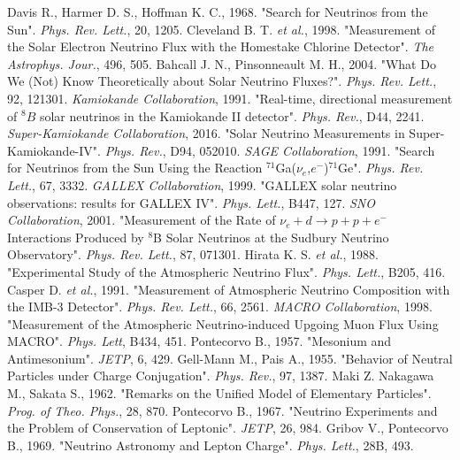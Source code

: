 \documentclass[english]{article}
\begin{document}
\begin{thebibliography}{99}
    Davis R., Harmer D. S., Hoffman K. C., 1968. "Search for Neutrinos from the Sun". \textit{Phys. Rev. Lett.}, 20, 1205.
    Cleveland B. T. \textit{et al.}, 1998. "Measurement of the Solar Electron Neutrino Flux with the Homestake Chlorine Detector". \textit{The Astrophys. Jour.}, 496, 505.
    Bahcall J. N., Pinsonneault M. H., 2004. "What Do We (Not) Know Theoretically about Solar Neutrino Fluxes?". \textit{Phys. Rev. Lett.}, 92, 121301.
    \textit{Kamiokande Collaboration}, 1991. "Real-time, directional measurement of ${}^{8} B$ solar neutrinos in the Kamiokande II detector". \textit{Phys. Rev.}, D44, 2241.
    \textit{Super-Kamiokande Collaboration}, 2016. "Solar Neutrino Measurements in Super-Kamiokande-IV". \textit{Phys. Rev.}, D94, 052010.
    \textit{SAGE Collaboration}, 1991. "Search for Neutrinos from the Sun Using the Reaction ${}^{71}$Ga($\nu_{e}$,$e^{-}$)${}^{71}$Ge". \textit{Phys. Rev. Lett.}, 67, 3332.
    \textit{GALLEX Collaboration}, 1999. "GALLEX solar neutrino observations: results for GALLEX IV". \textit{Phys. Lett.}, B447, 127.
    \textit{SNO Collaboration}, 2001. "Measurement of the Rate of $\nu_{e} +d \rightarrow p+p+e^{-}$ Interactions Produced by ${}^{8}$B Solar Neutrinos at the Sudbury Neutrino Observatory". \textit{Phys. Rev. Lett.}, 87, 071301.
    Hirata K. S. \textit{et al.}, 1988. "Experimental Study of the Atmospheric Neutrino Flux". \textit{Phys. Lett.}, B205, 416.
    Casper D. \textit{et al.}, 1991. "Measurement of Atmospheric Neutrino Composition with the IMB-3 Detector". \textit{Phys. Rev. Lett.}, 66, 2561.
    \textit{MACRO Collaboration}, 1998. "Measurement of the Atmospheric Neutrino-induced Upgoing Muon Flux Using MACRO". \textit{Phys. Lett}, B434, 451.
    Pontecorvo B., 1957. "Mesonium and Antimesonium". \textit{JETP}, 6, 429.
    Gell-Mann M., Pais A., 1955. "Behavior of Neutral Particles under Charge Conjugation". \textit{Phys. Rev.}, 97, 1387.
    Maki Z. Nakagawa M., Sakata S., 1962. "Remarks on the Unified Model of Elementary Particles". \textit{Prog. of Theo. Phys.}, 28, 870.
    Pontecorvo B., 1967. "Neutrino Experiments and the Problem of Conservation of Leptonic". \textit{JETP}, 26, 984.
    Gribov V., Pontecorvo B., 1969. "Neutrino Astronomy and Lepton Charge". \textit{Phys. Lett.}, 28B, 493.

\end{thebibliography}
\end{document}
